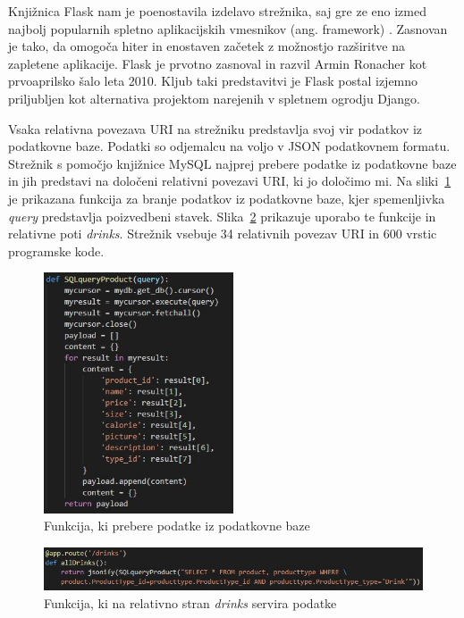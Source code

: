 \documentclass[a4paper, 12pt]{book}
\begin{document}
Knjižnica Flask nam je poenostavila izdelavo strežnika, saj gre ze eno izmed najbolj popularnih spletno aplikacijskih vmesnikov (ang. framework) \cite{Flask}. Zasnovan je tako, da omogoča hiter in enostaven začetek z možnostjo razširitve na zapletene aplikacije. Flask je prvotno zasnoval in razvil Armin Ronacher kot prvoaprilsko šalo leta 2010. Kljub taki predstavitvi je Flask postal izjemno priljubljen kot alternativa projektom narejenih v spletnem ogrodju Django.

Vsaka relativna povezava URI na strežniku predstavlja svoj vir podatkov iz podatkovne baze. Podatki so odjemalcu na voljo v JSON podatkovnem formatu. Strežnik s pomočjo knjižnice MySQL najprej prebere podatke iz podatkovne baze in jih predstavi na določeni relativni povezavi URI, ki jo določimo mi. Na sliki~\ref{Drinks_DB_function} je prikazana funkcija za branje podatkov iz podatkovne baze, kjer spemenljivka \textit{query} predstavlja poizvedbeni stavek. Slika~\ref{Drinks_URI} prikazuje uporabo te funkcije in relativne poti \textit{drinks}. Strežnik vsebuje 34 relativnih povezav URI in 600 vrstic programske kode.


\begin{figure}[!htb]
\begin{center}
\includegraphics[width=0.5\textwidth]{drinks_1.jpg}
\caption{Funkcija, ki prebere podatke iz podatkovne baze}
\label{Drinks_DB_function}
\end{center}
\end{figure}

\begin{figure}[!htb]
\begin{center}
\includegraphics[width=14cm]{drinks_2.jpg}
\caption{Funkcija, ki na relativno stran \textit{drinks} servira podatke}
\label{Drinks_URI}
\end{center}
\end{figure}
\end{document}
